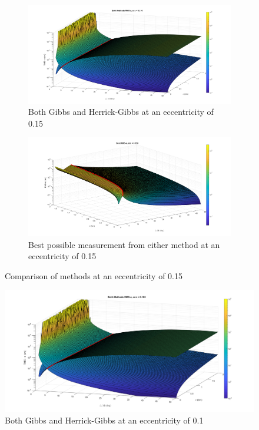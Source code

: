 \documentclass[12pt]{article}
\begin{document}
\begin{figure}[H]
	\centering
	\begin{subfigure}{.5\textwidth}
		\centering
		\includegraphics[width=1.1\textwidth]{bothMethods_e_15}
		\caption{Both Gibbs and Herrick-Gibbs at an eccentricity of 0.15}
		\label{fig:e151}
	\end{subfigure}%
	\begin{subfigure}{.5\textwidth}
		\centering
		\includegraphics[width=1.1\linewidth]{bestMethods_e_15}
		\caption{Best possible measurement from either method at an eccentricity of 0.15}
		\label{fig:e152}
	\end{subfigure}
	\caption{Comparison of methods at an eccentricity of 0.15}
	\label{fig:test3}
\end{figure}
\iffalse
	\begin{figure}[H]
	\centering
	\includegraphics[width=0.7\linewidth]{bothMethods_e_1}
	\caption{Both Gibbs and Herrick-Gibbs at an eccentricity of 0.1}
	\label{fig:bothmethodse1}
\end{figure}
\end{document}
